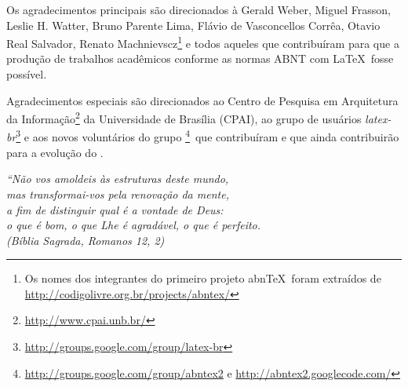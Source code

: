 \begin{agradecimentos}
	Os agradecimentos principais são direcionados à Gerald Weber, Miguel Frasson,
	Leslie H. Watter, Bruno Parente Lima, Flávio de Vasconcellos Corrêa, Otavio Real
	Salvador, Renato Machnievscz\footnote{Os nomes dos integrantes do primeiro
		projeto abn\TeX\ foram extraídos de
		\url{http://codigolivre.org.br/projects/abntex/}} e todos aqueles que
	contribuíram para que a produção de trabalhos acadêmicos conforme
	as normas ABNT com \LaTeX\ fosse possível.
	
	Agradecimentos especiais são direcionados ao Centro de Pesquisa em Arquitetura
	da Informação\footnote{\url{http://www.cpai.unb.br/}} da Universidade de
	Brasília (CPAI), ao grupo de usuários
	\emph{latex-br}\footnote{\url{http://groups.google.com/group/latex-br}} e aos
	novos voluntários do grupo
	\emph{\abnTeX}\footnote{\url{http://groups.google.com/group/abntex2} e
		\url{http://abntex2.googlecode.com/}}~que contribuíram e que ainda
	contribuirão para a evolução do \abnTeX.
	
\end{agradecimentos}

\begin{epigrafe}
	\vspace*{\fill}
	\begin{flushright}
		\textit{``Não vos amoldeis às estruturas deste mundo, \\
			mas transformai-vos pela renovação da mente, \\
			a fim de distinguir qual é a vontade de Deus: \\
			o que é bom, o que Lhe é agradável, o que é perfeito.\\
			(Bíblia Sagrada, Romanos 12, 2)}
	\end{flushright}
\end{epigrafe}


